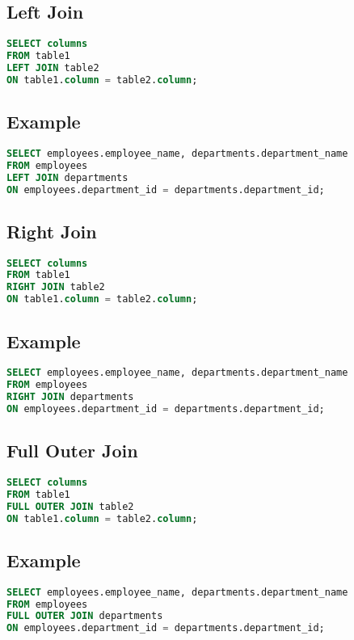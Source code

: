 \documentclass{article}
\begin{document}
\subsection{Left Join}
\begin{lstlisting}[language=SQL]
SELECT columns
FROM table1
LEFT JOIN table2
ON table1.column = table2.column;
\end{lstlisting}

\subsection{Example}
\begin{lstlisting}[language=SQL]
SELECT employees.employee_name, departments.department_name
FROM employees
LEFT JOIN departments
ON employees.department_id = departments.department_id;
\end{lstlisting}

\subsection{Right Join}
\begin{lstlisting}[language=SQL]
SELECT columns
FROM table1
RIGHT JOIN table2
ON table1.column = table2.column;
\end{lstlisting}

\subsection{Example}
\begin{lstlisting}[language=SQL]
SELECT employees.employee_name, departments.department_name
FROM employees
RIGHT JOIN departments
ON employees.department_id = departments.department_id;
\end{lstlisting}

\subsection{Full Outer Join}
\begin{lstlisting}[language=SQL]
SELECT columns
FROM table1
FULL OUTER JOIN table2
ON table1.column = table2.column;
\end{lstlisting}

\subsection{Example}
\begin{lstlisting}[language=SQL]
SELECT employees.employee_name, departments.department_name
FROM employees
FULL OUTER JOIN departments
ON employees.department_id = departments.department_id;
\end{lstlisting}
\end{document}
